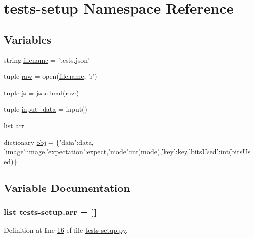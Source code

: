 \hypertarget{namespacetests-setup}{\section{tests-\/setup Namespace Reference}
\label{namespacetests-setup}
}
\subsection*{Variables}
\begin{DoxyCompactItemize}
\item 
string \hyperlink{namespacetests-setup_a1c1b6d4c14026d664106586c65e10a94}{filename} = 'tests.\-json'
\item 
tuple \hyperlink{namespacetests-setup_a1788203b7bbd6108e09617328eaeceb9}{raw} = open(\hyperlink{namespacetests-setup_a1c1b6d4c14026d664106586c65e10a94}{filename}, 'r')
\item 
tuple \hyperlink{namespacetests-setup_a08da0efe29fc9ddaa5f121eda9688b6d}{js} = json.\-load(\hyperlink{namespacetests-setup_a1788203b7bbd6108e09617328eaeceb9}{raw})
\item 
tuple \hyperlink{namespacetests-setup_afd542601d7bb174d46d247a6b8f52580}{input\-\_\-data} = input()
\item 
list \hyperlink{namespacetests-setup_a274aaa7c0d5733ef5f48372d9481f34a}{arr} = \mbox{[}$\,$\mbox{]}
\item 
dictionary \hyperlink{namespacetests-setup_afb80c1236926b5468a6d3e942a527a96}{obj} = \{'data'\-:data, 'image'\-:image,'expectation'\-:expect,'mode'\-:int(mode),'key'\-:key,'bits\-Used'\-:int(bits\-Used)\}
\end{DoxyCompactItemize}


\subsection{Variable Documentation}
\hypertarget{namespacetests-setup_a274aaa7c0d5733ef5f48372d9481f34a}{
\subsubsection[{arr}]{\setlength{\rightskip}{0pt plus 5cm}list tests-\/setup.\-arr = \mbox{[}$\,$\mbox{]}}}\label{namespacetests-setup_a274aaa7c0d5733ef5f48372d9481f34a}


Definition at line \hyperlink{tests-setup_8py_source_l00016}{16} of file \hyperlink{tests-setup_8py_source}{tests-\/setup.\-py}.

